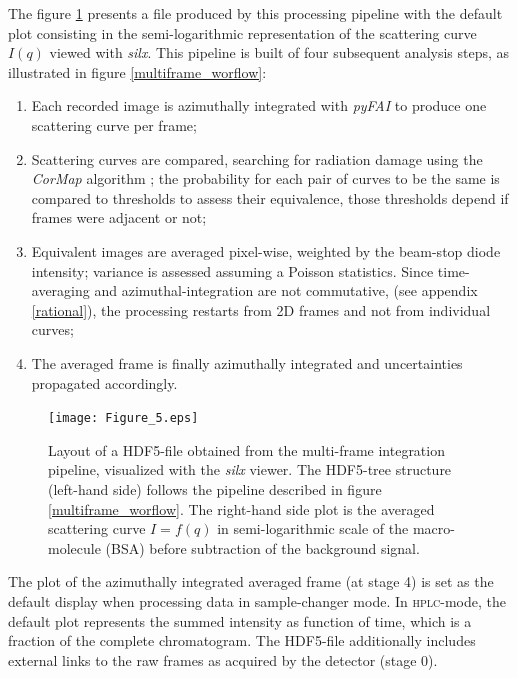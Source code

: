 \documentclass[preprint]{iucr}              %
\begin{document}
The figure \ref{multiframe} presents a file produced by this processing pipeline with the default plot consisting in the semi-logarithmic representation of the scattering curve $I(q)$ viewed with \textit{silx}.
This pipeline is built of four subsequent analysis steps, as illustrated in figure \ref{multiframe_worflow}:
\begin{enumerate}
\item Each recorded image is azimuthally integrated with \textit{pyFAI} \cite{pyfai_2020} to produce one scattering curve per frame;
\item Scattering curves are compared, searching for radiation damage using the \textit{CorMap} algorithm \cite{CorMap}; the probability for each pair of curves to be the same is compared to thresholds to assess their equivalence, those thresholds depend if frames were adjacent or not;
\item Equivalent images are averaged pixel-wise, weighted by the beam-stop diode intensity; variance is assessed assuming a Poisson statistics. Since time-averaging and azimuthal-integration are not commutative, (see appendix \ref{rational}), the processing restarts from 2D frames and not from individual curves;
\item The averaged frame is finally azimuthally integrated and uncertainties propagated accordingly. 
\end{enumerate}

\begin{figure}
     \caption{Layout of a HDF5-file obtained from the multi-frame integration pipeline, visualized with the \textit{silx} viewer.
     The HDF5-tree structure (left-hand side) follows the pipeline described in figure \ref{multiframe_worflow}.
     The right-hand side plot is the averaged scattering curve $I=f(q)$ in semi-logarithmic scale of the macro-molecule (BSA) before subtraction of the background signal.}
     \texttt{[image: Figure\_5.eps]}
     \label{multiframe}
\end{figure}

The plot of the azimuthally integrated averaged frame (at stage 4) is set as the default display  when processing data in sample-changer mode.
In \textsc{hplc}-mode, the default plot represents the summed intensity as function of time, which is a fraction of the complete chromatogram. 
The HDF5-file additionally includes external links to the raw frames as acquired by the detector (stage 0).
\end{document}
